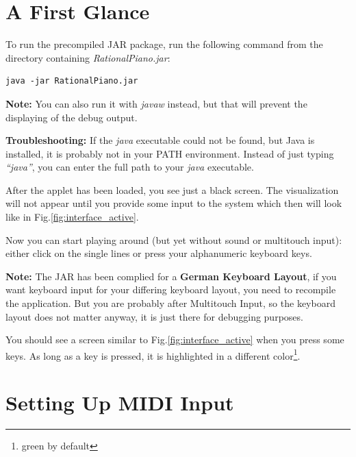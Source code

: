 \documentclass[12pt,a4paper,titlepage,oneside]{report}
\begin{document}
\section{A First Glance}

To run the precompiled JAR package, run the following command from the directory containing \emph{RationalPiano.jar}:

\begin{verbatim}
java -jar RationalPiano.jar
\end{verbatim}

\textbf{Note:} You can also run it with \emph{javaw} instead, but that will prevent the displaying of the debug output.

\textbf{Troubleshooting:} If the \emph{java} executable could not be found, but Java is installed, it is probably not in your PATH environment. Instead of just typing \emph{``java''}, you can enter the full path to your \emph{java} executable.


After the applet has been loaded, you see just a black screen. The visualization will not appear until you provide some input to the system which then will look like in Fig.\ref{fig:interface_active}.

Now you can start playing around (but yet without sound or multitouch input): either click on the single lines or press your alphanumeric keyboard keys.

\textbf{Note:} The JAR has been complied for a \textbf{German Keyboard Layout}, if you want keyboard input for your differing keyboard layout, you need to recompile the application. But you are probably after Multitouch Input, so the keyboard layout does not matter anyway, it is just there for debugging purposes.

You should see a screen similar to Fig.\ref{fig:interface_active} when you press some keys. As long as a key is pressed, it is highlighted in a different color\footnote{green by default}.

\section{Setting Up MIDI Input}
\label{sec:midiinput}
\end{document}
